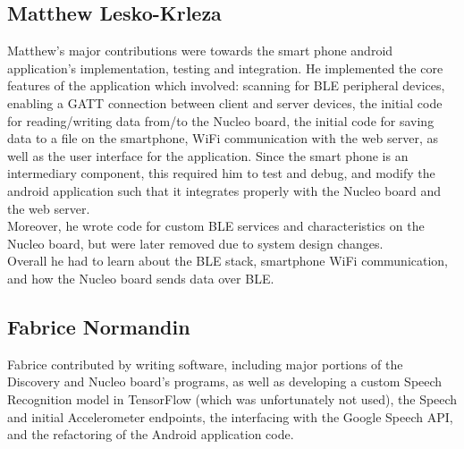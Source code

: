 \subsection*{Matthew Lesko-Krleza}
Matthew's major contributions were towards the smart phone android application's implementation, testing and integration. 
He implemented the core features of the application which involved: scanning for BLE peripheral devices, enabling
a GATT connection between client and server devices, the initial code for reading/writing data from/to the Nucleo
board, the initial code for saving data to a file on the smartphone, WiFi communication with the web server, as well as
the user interface for the application. Since the smart phone is an intermediary component, this required him to test and 
debug, and modify the android application such that it integrates properly with the Nucleo board and the web server.\\
Moreover, he wrote code for custom BLE services and characteristics on the Nucleo board, but were later removed due to 
system design changes.\\
Overall he had to learn about the BLE stack, smartphone WiFi communication, and how the Nucleo board sends data over BLE.

\subsection*{Fabrice Normandin}
Fabrice contributed by writing software, including major portions of the Discovery and Nucleo board's programs, as well as developing a custom Speech Recognition model in TensorFlow (which was unfortunately not used), the Speech and initial Accelerometer endpoints, the interfacing with the Google Speech API, and the refactoring of the Android application code.